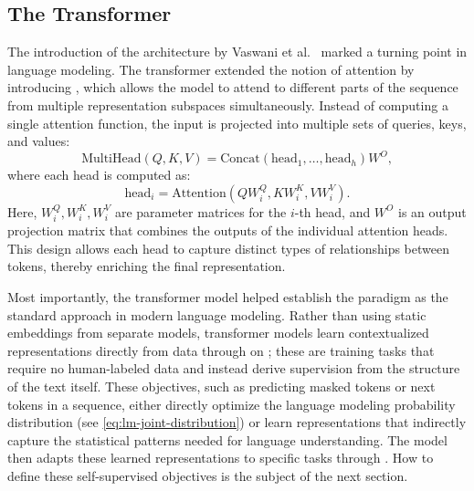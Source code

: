 \subsection{The Transformer}
The introduction of the  architecture by Vaswani et al.~\citep{vaswani2017attention} marked a turning point in language modeling. The transformer extended the notion of attention by introducing , which allows the model to attend to different parts of the sequence from multiple representation subspaces simultaneously. Instead of computing a single attention function, the input is projected into multiple sets of queries, keys, and values:
\begin{equation}
\text{MultiHead}(Q, K, V) = \text{Concat}(\text{head}_1, \dots, \text{head}_h)W^O,
\end{equation}
where each head is computed as:
\begin{equation}
\text{head}_i = \text{Attention}(QW_i^Q, KW_i^K, VW_i^V).
\end{equation}
Here, $W_i^Q, W_i^K, W_i^V$ are parameter matrices for the $i$-th head, and $W^O$ is an output projection matrix that combines the outputs of the individual attention heads. This design allows each head to capture distinct types of relationships between tokens, thereby enriching the final representation.

Most importantly, the transformer model helped establish the  paradigm as the standard approach in modern language modeling. Rather than using static embeddings from separate models, transformer models learn contextualized representations directly from data through  on ; these are training tasks that require no human-labeled data and instead derive supervision from the structure of the text itself. These objectives, such as predicting masked tokens or next tokens in a sequence, either directly optimize the language modeling probability distribution (see \cref{eq:lm-joint-distribution}) or learn representations that indirectly capture the statistical patterns needed for language understanding. The model then adapts these learned representations to specific tasks through . How to define these self-supervised objectives is the subject of the next section.



